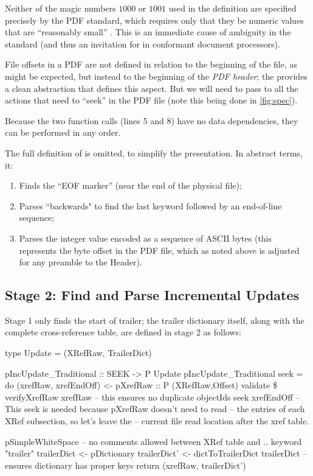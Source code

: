 Neither of the magic numbers $1000$ or $1001$ used in the definition are specified precisely
by the PDF standard, which requires only that they be numeric values
that are ``reasonably small'' .
%
This is an immediate cause of ambiguity in the standard (and thus an
invitation for \pd{} in conformant document processors).

File offsets in a PDF are not defined in relation to the beginning of
the file, as might be expected, but instead to the beginning of the
\emph{PDF header};
%
the  provides a clean abstraction that defines this
aspect.
%
But we will need to pass  to all the actions that need to
``seek'' in the PDF file (note this being done in \cref{fig:spec}).

Because the two function calls (lines 5 and 8) have no data
dependencies, they can be performed in any order.
%

The full definition of  is
omitted, to simplify the presentation.
%
In abstract terms, it:
\begin{enumerate}
\item Finds the ``EOF marker''  (near the end of the physical
  file);
\item Parses ``backwards" to find the last  keyword
  followed by an end-of-line sequence;
\item Parses the integer value encoded as a sequence of ASCII bytes
  (this represents the byte offset in the PDF file, which as noted
  above is adjusted for any preamble to the Header).
\end{enumerate}

\subsection{Stage 2: Find and Parse Incremental Updates}
\label{sec:stage-2}
%
Stage 1 only finds the start of trailer;
%
the trailer dictionary itself, along with the complete cross-reference table, are defined in stage 2 as follows:
%
\lstset{numbers=right}
\begin{code}
type Update = (XRefRaw, TrailerDict)

pIncUpdate_Traditional :: SEEK -> P Update
pIncUpdate_Traditional seek =
    do
    (xrefRaw, xrefEndOff) <- pXrefRaw :: P (XRefRaw,Offset)
    validate \$
      verifyXrefRaw xrefRaw
        -- this ensures no duplicate objectIds
    seek xrefEndOff
       -- This seek is needed because pXrefRaw doesn't need to read
       -- the entries of each XRef subsection, so let's leave the
       -- current file read location after the xref table.

    pSimpleWhiteSpace -- no comments allowed between XRef table and ..
    keyword "trailer"
    trailerDict  <- pDictionary
    trailerDict' <- dictToTrailerDict trailerDict
                    -- ensures dictionary has proper keys
    return (xrefRaw, trailerDict')
\end{code}
\lstset{numbers=none}

